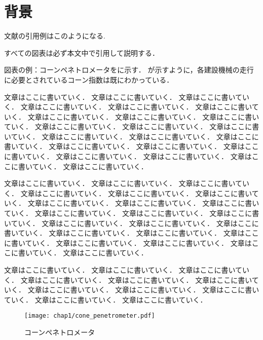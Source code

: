 \documentclass[../main]{subfiles}
\begin{document}
\section{背景}
\label{sec:intro_background}
文献の引用例はこのようになる\cite{cao2014main1-1-4-3,Kiribayashi2018,kingma2017Adam,tang2021cause}.

すべての図表は必ず本文中で引用して説明する．

図表の例：コーンペネトロメータをに示す．
が示すように，各建設機械の走行に必要とされているコーン指数は既にわかっている．

文章はここに書いていく．
文章はここに書いていく．
文章はここに書いていく．
文章はここに書いていく．
文章はここに書いていく．
文章はここに書いていく．
文章はここに書いていく．
文章はここに書いていく．
文章はここに書いていく．
文章はここに書いていく．
文章はここに書いていく．
文章はここに書いていく．
文章はここに書いていく．
文章はここに書いていく．
文章はここに書いていく．
文章はここに書いていく．
文章はここに書いていく．
文章はここに書いていく．
文章はここに書いていく．
文章はここに書いていく．
文章はここに書いていく．
文章はここに書いていく．

文章はここに書いていく．
文章はここに書いていく．
文章はここに書いていく．
文章はここに書いていく．
文章はここに書いていく．
文章はここに書いていく．
文章はここに書いていく．
文章はここに書いていく．
文章はここに書いていく．
文章はここに書いていく．
文章はここに書いていく．
文章はここに書いていく．
文章はここに書いていく．
文章はここに書いていく．
文章はここに書いていく．
文章はここに書いていく．
文章はここに書いていく．
文章はここに書いていく．
文章はここに書いていく．
文章はここに書いていく．
文章はここに書いていく．
文章はここに書いていく．

文章はここに書いていく．
文章はここに書いていく．
文章はここに書いていく．
文章はここに書いていく．
文章はここに書いていく．
文章はここに書いていく．
文章はここに書いていく．
文章はここに書いていく．
文章はここに書いていく．
文章はここに書いていく．
文章はここに書いていく．


\begin{figure}[t]
  \centering
  \texttt{[image: chap1/cone\_penetrometer.pdf]}
  \caption{コーンペネトロメータ}
  \label{fig:cone_penetrometer}
\end{figure}

\end{document}
